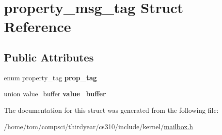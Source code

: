 \hypertarget{structproperty__msg__tag}{}\section{property\+\_\+msg\+\_\+tag Struct Reference}
\label{structproperty__msg__tag}
\subsection*{Public Attributes}
\begin{DoxyCompactItemize}
\item 
\mbox{\label{structproperty__msg__tag_af14e4fec69912c7fca9ea72ed4de4384}} 
enum property\+\_\+tag {\bfseries prop\+\_\+tag}
\item 
\mbox{\label{structproperty__msg__tag_a6bca74507ede928fffccf688f6a2596f}} 
union \mbox{\hyperlink{unionvalue__buffer}{value\+\_\+buffer}} {\bfseries value\+\_\+buffer}
\end{DoxyCompactItemize}


The documentation for this struct was generated from the following file\+:\begin{DoxyCompactItemize}
\item 
/home/tom/compsci/thirdyear/cs310/include/kernel/\mbox{\hyperlink{mailbox_8h}{mailbox.\+h}}\end{DoxyCompactItemize}
